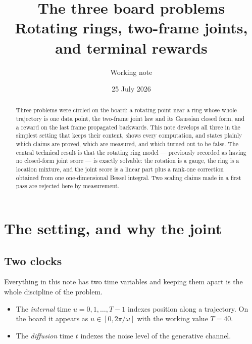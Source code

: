 \documentclass[11pt]{article}
\title{The three board problems\\[2pt]
\large Rotating rings, two-frame joints, and terminal rewards}
\author{Working note}
\date{25 July 2026}
\theoremstyle{plain}
\theoremstyle{remark}
\begin{document}
\maketitle

\begin{abstract}
\noindent
Three problems were circled on the board: a rotating point near a ring whose
whole trajectory is one data point, the two-frame joint law and its Gaussian
closed form, and a reward on the last frame propagated backwards. This note
develops all three in the simplest setting that keeps their content, shows every
computation, and states plainly which claims are proved, which are measured, and
which turned out to be false. The central technical result is that the rotating
ring model --- previously recorded as having no closed-form joint score --- is
exactly solvable: the rotation is a gauge, the ring is a location mixture, and
the joint score is a linear part plus a rank-one correction obtained from one
one-dimensional Bessel integral. Two scaling claims made in a first pass are
rejected here by measurement.
\end{abstract}

\tableofcontents

\section{The setting, and why the joint}\label{sec:setting}

\subsection{Two clocks}

Everything in this note has two time variables and keeping them apart is the
whole discipline of the problem.

\begin{itemize}[leftmargin=1.4em, itemsep=2pt]
\item The \emph{internal} time $u = 0, 1, \dots, T-1$ indexes position along a
      trajectory. On the board it appears as $u \in [0, 2\pi/\omega]$ with the
      working value $T = 40$.
\item The \emph{diffusion} time $t$ indexes the noise level of the generative
      channel.
\end{itemize}
\end{document}
